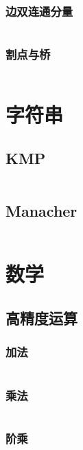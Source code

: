 \documentclass[a4paper,11pt]{article}
\begin{document}
\subsubsection{边双连通分量}
\inputminted[linenos,autogobble]{java}{graph/tarjan-be.java}

\subsubsection{割点与桥}
\inputminted[linenos,autogobble]{java}{graph/tarjan-ve.java}


\newpage
\section{字符串}

\subsection{KMP}
\inputminted[linenos,autogobble]{java}{string/kmp.java}

\subsection{Manacher}
\inputminted[linenos,autogobble]{java}{string/manacher.java}

\newpage
\section{数学}

\subsection{高精度运算}
\subsubsection{加法}
\inputminted[linenos,autogobble]{java}{math/add.java}

\subsubsection{乘法}
\inputminted[linenos,autogobble]{java}{math/mul.java}

\subsubsection{阶乘}
\inputminted[linenos,autogobble]{java}{math/pow.java}
\end{document}
